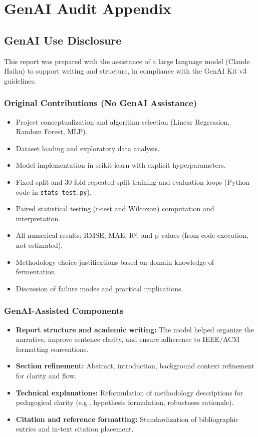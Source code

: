 \documentclass[conference]{IEEEtran}
\begin{document}
\section*{GenAI Audit Appendix}

\subsection*{GenAI Use Disclosure}
This report was prepared with the assistance of a large language model (Claude Haiku) to support writing and structure, in compliance with the GenAI Kit v3 guidelines.

\subsubsection*{Original Contributions (No GenAI Assistance)}
\begin{itemize}
\item Project conceptualization and algorithm selection (Linear Regression, Random Forest, MLP).
\item Dataset loading and exploratory data analysis.
\item Model implementation in scikit-learn with explicit hyperparameters.
\item Fixed-split and 30-fold repeated-split training and evaluation loops (Python code in \texttt{stats\_test.py}).
\item Paired statistical testing (t-test and Wilcoxon) computation and interpretation.
\item All numerical results: RMSE, MAE, R², and p-values (from code execution, not estimated).
\item Methodology choice justifications based on domain knowledge of fermentation.
\item Discussion of failure modes and practical implications.
\end{itemize}

\subsubsection*{GenAI-Assisted Components}
\begin{itemize}
\item \textbf{Report structure and academic writing:} The model helped organize the narrative, improve sentence clarity, and ensure adherence to IEEE/ACM formatting conventions.
\item \textbf{Section refinement:} Abstract, introduction, background context refinement for clarity and flow.
\item \textbf{Technical explanations:} Reformulation of methodology descriptions for pedagogical clarity (e.g., hypothesis formulation, robustness rationale).
\item \textbf{Citation and reference formatting:} Standardization of bibliographic entries and in-text citation placement.
\end{itemize}
\end{document}

